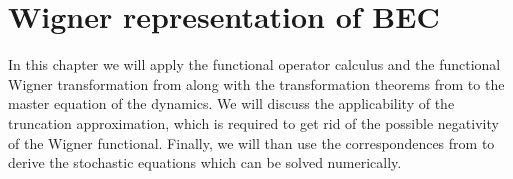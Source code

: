 \chapter{Wigner representation of BEC}
\label{cha:wigner-bec}

In this chapter we will apply the functional operator calculus and the functional Wigner transformation from  along with the transformation theorems from  to the master equation of the  dynamics.
We will discuss the applicability of the truncation approximation, which is required to get rid of the possible negativity of the Wigner functional.
Finally, we will than use the correspondences from  to derive the stochastic equations which can be solved numerically.









